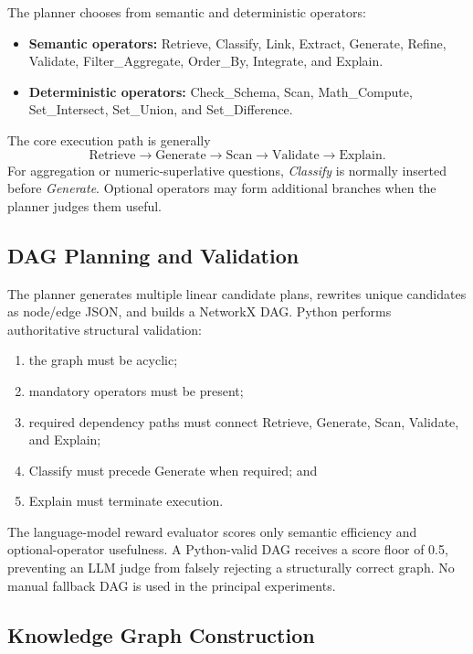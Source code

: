 \documentclass[11pt]{article}
\begin{document}
The planner chooses from semantic and deterministic operators:

\begin{itemize}[leftmargin=*]
    \item \textbf{Semantic operators:} Retrieve, Classify, Link, Extract, Generate, Refine, Validate, Filter\_Aggregate, Order\_By, Integrate, and Explain.
    \item \textbf{Deterministic operators:} Check\_Schema, Scan, Math\_Compute, Set\_Intersect, Set\_Union, and Set\_Difference.
\end{itemize}

The core execution path is generally
\[
\text{Retrieve} \rightarrow \text{Generate} \rightarrow \text{Scan}
\rightarrow \text{Validate} \rightarrow \text{Explain}.
\]
For aggregation or numeric-superlative questions, \textit{Classify} is normally inserted before \textit{Generate}. Optional operators may form additional branches when the planner judges them useful.

\subsection{DAG Planning and Validation}

The planner generates multiple linear candidate plans, rewrites unique candidates as node/edge JSON, and builds a NetworkX DAG. Python performs authoritative structural validation:

\begin{enumerate}[leftmargin=*]
    \item the graph must be acyclic;
    \item mandatory operators must be present;
    \item required dependency paths must connect Retrieve, Generate, Scan, Validate, and Explain;
    \item Classify must precede Generate when required; and
    \item Explain must terminate execution.
\end{enumerate}

The language-model reward evaluator scores only semantic efficiency and optional-operator usefulness. A Python-valid DAG receives a score floor of 0.5, preventing an LLM judge from falsely rejecting a structurally correct graph. No manual fallback DAG is used in the principal experiments.

\subsection{Knowledge Graph Construction}
\end{document}
